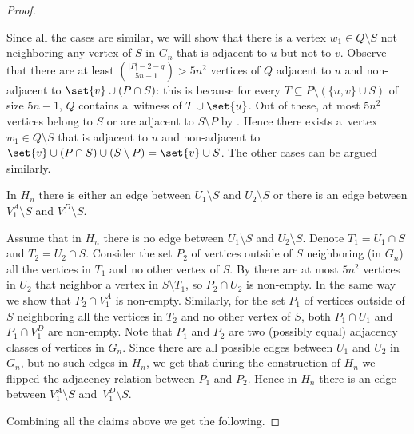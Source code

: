 \begin{proof}
\begin{claimproof}
        Since all the cases are similar, we will show that there is a vertex $w_1 \in Q \setminus S$ not neighboring any vertex of $S$ in $G_n$ that is adjacent to $u$ but not to $v$.
        Observe that there are at least $\binom{|P| - 2 - q}{5n - 1} > 5n^2$ vertices of $Q$ adjacent to $u$ and non-adjacent to $\set{v} \cup (P \cap S)$: this is because for every $T \subseteq P \setminus (\{u, v\} \cup S)$ of size $5n - 1$, $Q$ contains a~witness of $T \cup \set{u}$.
        Out of these, at most $5n^2$ vertices belong to $S$ or are adjacent to $S \setminus P$ by .
        Hence there exists a~vertex $w_1 \in Q \setminus S$ that is adjacent to $u$ and non-adjacent to $\set{v} \cup (P \cap S) \cup (S \setminus P) = \set{v} \cup S$. The other cases can be argued similarly.
    \end{claimproof}

    \begin{claim}
        \label{cl:center-adjacency}
        In $H_n$ there is either an edge between $U_1 \setminus S$ and $U_2 \setminus S$ or there is an edge between $V_1^A \setminus S$ and $V_1^D \setminus S$.
    \end{claim}
    \begin{claimproof}
        Assume that in $H_n$ there is no edge between $U_1 \setminus S$ and $U_2 \setminus S$.
        Denote $T_1 = U_1 \cap S$ and $T_2 = U_2 \cap S$.
        Consider the set $P_2$ of vertices outside of $S$ neighboring (in $G_n$) all the vertices in $T_1$ and no other vertex of $S$.
        By  there are at most $5n^2$ vertices in $U_2$ that neighbor a vertex in $S \setminus T_1$, so $P_2 \cap U_2$ is non-empty.
        In the same way we show that $P_2 \cap V_1^A$ is non-empty.
        Similarly, for the set $P_1$ of vertices outside of $S$ neighboring all the vertices in $T_2$ and no other vertex of $S$, both $P_1 \cap U_1$ and $P_1 \cap V_1^D$ are non-empty.
        Note that $P_1$ and $P_2$ are two (possibly equal) adjacency classes of vertices in $G_n$.
        Since there are all possible edges between $U_1$ and $U_2$ in $G_n$, but no such edges in $H_n$, we get that during the construction of $H_n$ we flipped the adjacency relation between $P_1$ and $P_2$.
        Hence in $H_n$ there is an edge between $V_1^A \setminus S$ and~$V_1^D \setminus S$.
    \end{claimproof}

    Combining all the claims above we get the following.


\end{proof}
